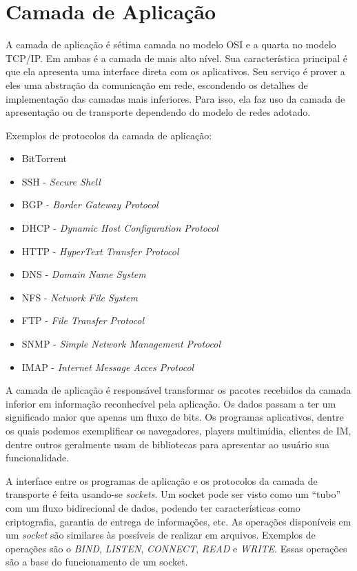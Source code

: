 \documentclass[brazil,times,12pt]{abnt}
\begin{document}
\section*{Camada de Aplicação}
	A camada de aplicação é sétima camada no modelo OSI e a quarta no modelo
	TCP/IP. Em ambas é a camada de mais alto nível. Sua característica principal é
	que ela apresenta uma interface direta com os aplicativos. Seu serviço
	é prover a eles uma abstração da comunicação em rede, escondendo os detalhes
	de implementação das camadas mais inferiores. Para isso, ela faz uso da
	camada de apresentação ou de transporte dependendo do modelo de redes
	adotado.

	Exemplos de protocolos da camada de aplicação:
	
	\begin{itemize}
		\item BitTorrent
		\item SSH - \emph{Secure Shell}
		\item BGP - \emph{Border Gateway Protocol}
		\item DHCP - \emph{Dynamic Host Configuration Protocol}
		\item HTTP - \emph{HyperText Transfer Protocol}
		\item DNS - \emph{Domain Name System}
		\item NFS - \emph{Network File System}
		\item FTP - \emph{File Transfer Protocol}
		\item SNMP - \emph{Simple Network Management Protocol}
		\item IMAP - \emph{Internet Message Acces Protocol}
		
	\end{itemize}
	
	A camada de aplicação é responsável transformar os pacotes recebidos da camada
	inferior em informação reconhecível pela aplicação. Os dados passam a ter um
	significado maior que apenas um fluxo de bits. Os programas aplicativos, dentre
	os quais podemos exemplificar os navegadores, players multimídia, clientes de
	IM, dentre outros geralmente usam de bibliotecas para apresentar ao usuário sua
	funcionalidade.
	
	A interface entre os programas de aplicação e os protocolos da camada de
	transporte é feita usando-se \emph{sockets}. Um socket pode ser visto como um
	``tubo'' com um fluxo bidirecional de dados, podendo ter características como
	criptografia, garantia de entrega de informações, etc. As operações disponíveis
	em um \emph{socket} são similares às possíveis de realizar em arquivos.
	Exemplos de operações são o \emph{BIND}, \emph{LISTEN}, \emph{CONNECT},
	\emph{READ} e \emph{WRITE}. Essas operações são a base do funcionamento de um
	socket.
\end{document}
